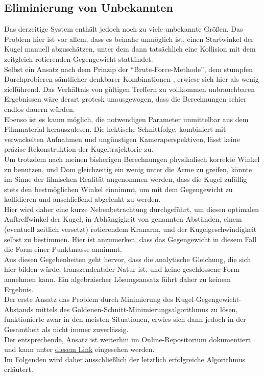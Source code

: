 \subsection{Eliminierung von Unbekannten}
Das derzeitige System enthält jedoch noch zu viele unbekannte Größen. Das Problem hier ist vor allem, dass es beinahe unmöglich ist, einen Startwinkel der Kugel manuell abzuschätzen, unter dem dann tatsächlich eine Kollision mit dem zeitgleich rotierenden Gegengewicht stattfindet. 
\\
Selbst ein Ansatz nach dem Prinzip der \enquote{Brute-Force-Methode}, dem stumpfen Durchprobieren sämtlicher denkbarer Kombinationen \parencite{BruteForceWiki}, erwiese sich hier als wenig zielführend. Das Verhältnis von gültigen Treffern zu vollkommen unbrauchbaren Ergebnissen wäre derart grotesk unausgewogen, dass die Berechnungen schier endlos dauern würden.
\\
Ebenso ist es kaum möglich, die notwendigen Parameter unmittelbar aus dem Filmmaterial herauszulesen. Die hektische Schnittfolge, kombiniert mit verwackelten Aufnahmen und ungünstigen Kameraperspektiven, lässt keine präzise Rekonstruktion der Kugeltrajektorie zu.
\\
Um trotzdem nach meinen bisherigen Berechnungen physikalisch korrekte Winkel zu benutzen, und Dom gleichzeitig ein wenig unter die Arme zu greifen, könnte im Sinne der filmischen Realität angenommen werden, dass die Kugel zufällig stets den bestmöglichen Winkel einnimmt, um mit dem Gegengewicht zu kollidieren und anschließend abgelenkt zu werden. 
\\
Hier wird daher eine kurze Nebenbetrachtung durchgeführt, um diesen optimalen Auftreffwinkel der Kugel, in Abhängigkeit von genannten Abständen, einem (eventuell zeitlich versetzt) rotierendem Kranarm, und der Kugelgeschwindigkeit selbst zu bestimmen. Hier ist anzumerken, dass das Gegengewicht in diesem Fall die Form einer Punktmasse annimmt.
\\
Aus diesen Gegebenheiten geht hervor, dass die analytische Gleichung, die sich hier bilden würde, transzendentaler Natur ist, und keine geschlossene Form annehmen kann. Ein algebraischer Lösungsansatz führt daher zu keinem Ergebnis. 
\\%
Der erste Ansatz das Problem durch Minimierung des Kugel-Gegengewicht-Abstands mittels des Goldenen-Schnitt-Minimierungsalgorithmus zu lösen, funktionierte zwar in den meisten Situationen, erwies sich dann jedoch in der Gesamtheit als nicht immer zuverlässig. 
\\
Der entsprechende, Ansatz ist weiterhin im Online-Repositorium dokumentiert und kann unter \href{https://github.com/grn-x/sc-analysis/blob/main/scripts/pythonProject/DEPRECATED--reduced_golden_section.py}{diesem Link} eingesehen werden.
\\
Im Folgenden wird daher ausschließlich der letztlich erfolgreiche Algorithmus erläutert.
